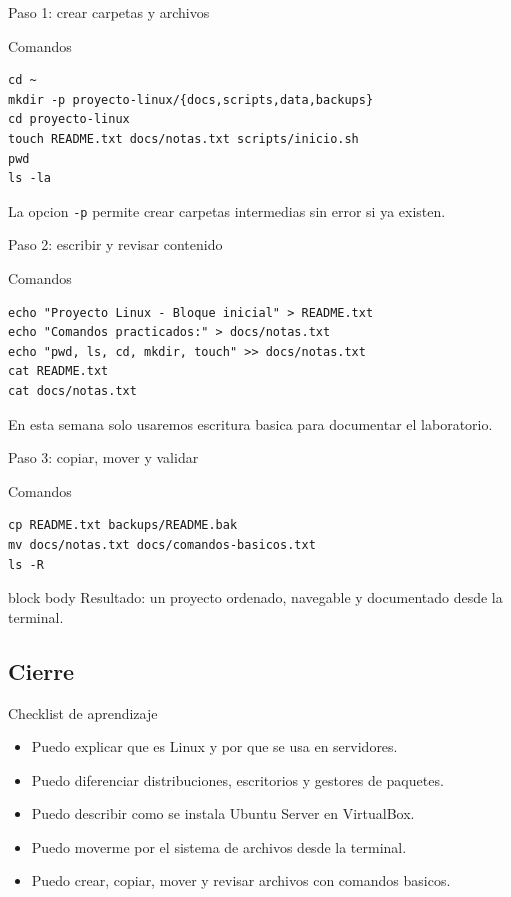 \documentclass[aspectratio=169]{beamer}
\begin{document}
\begin{frame}[fragile]{Paso 1: crear carpetas y archivos}
  \begin{exampleblock}{Comandos}
\begin{verbatim}
cd ~
mkdir -p proyecto-linux/{docs,scripts,data,backups}
cd proyecto-linux
touch README.txt docs/notas.txt scripts/inicio.sh
pwd
ls -la
\end{verbatim}
  \end{exampleblock}
  \vfill
  \small La opcion \texttt{-p} permite crear carpetas intermedias sin error si ya existen.
\end{frame}

\begin{frame}[fragile]{Paso 2: escribir y revisar contenido}
  \begin{exampleblock}{Comandos}
\begin{verbatim}
echo "Proyecto Linux - Bloque inicial" > README.txt
echo "Comandos practicados:" > docs/notas.txt
echo "pwd, ls, cd, mkdir, touch" >> docs/notas.txt
cat README.txt
cat docs/notas.txt
\end{verbatim}
  \end{exampleblock}
  \vfill
  \small En esta semana solo usaremos escritura basica para documentar el laboratorio.
\end{frame}

\begin{frame}[fragile]{Paso 3: copiar, mover y validar}
  \begin{exampleblock}{Comandos}
\begin{verbatim}
cp README.txt backups/README.bak
mv docs/notas.txt docs/comandos-basicos.txt
ls -R
\end{verbatim}
  \end{exampleblock}
  \vfill
  \begin{beamercolorbox}[rounded=true, shadow=false, sep=4pt, center]{block body}
    \small Resultado: un proyecto ordenado, navegable y documentado desde la terminal.
  \end{beamercolorbox}
\end{frame}

\subsection{Cierre}
\begin{frame}{Checklist de aprendizaje}
  \begin{itemize}
    \item Puedo explicar que es Linux y por que se usa en servidores.
    \item Puedo diferenciar distribuciones, escritorios y gestores de paquetes.
    \item Puedo describir como se instala Ubuntu Server en VirtualBox.
    \item Puedo moverme por el sistema de archivos desde la terminal.
    \item Puedo crear, copiar, mover y revisar archivos con comandos basicos.
  \end{itemize}
\end{frame}
\end{document}
